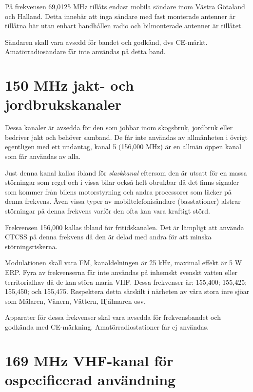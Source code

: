 \documentclass[12ypt,swedish,a4paper]{report}
\begin{document}
På frekvensen 69,0125 MHz tillåts endast mobila sändare inom Västra Götaland och Halland. Detta innebär att inga sändare med fast monterade antenner är tillåtna här utan enbart handhållen radio och bilmonterade antenner är tillåtet.

Sändaren skall vara avsedd för bandet och godkänd, dvs CE-märkt. Amatörradiosändare får inte användas på detta band.


\section{150 MHz jakt- och jordbrukskanaler}

Dessa kanaler är avsedda för den som jobbar inom skogsbruk, jordbruk eller bedriver jakt och behöver samband. De får inte användas av allmänheten i övrigt egentligen med ett undantag, kanal 5 (156,000 MHz) är en allmän öppen kanal som får användas av alla.

Just denna kanal kallas ibland för \textit{slaskkanal} eftersom den är utsatt för en massa störningar som regel och i vissa bilar också helt obrukbar då det finns signaler som kommer från bilens motorstyrning och andra processorer som läcker på denna frekvens. Även vissa typer av mobiltelefonisändare (basstationer) alstrar störningar på denna frekvens varför den ofta kan vara kraftigt störd.

Frekvensen 156,000 kallas ibland för fritidskanalen. Det är lämpligt att använda CTCSS på denna frekvens då den är delad med andra för att minska störningsriskerna.

Modulationen skall vara FM, kanaldelningen är 25 kHz, maximal effekt är 5 W ERP. Fyra av frekvenserna får inte användas på inhemskt svenskt vatten eller territorialhav då de kan störa marin VHF. Dessa frekvenser är: 155,400; 155,425; 155,450; och 155,475. Respektera detta särskilt i närheten av våra stora inre sjöar som Mälaren, Vänern, Vättern, Hjälmaren osv.

Apparater för dessa frekvenser skal vara avsedda för frekvensbandet och godkända med CE-märkning. Amatörradiostationer får ej användas.


\section{169 MHz VHF-kanal för ospecificerad användning}
\end{document}
